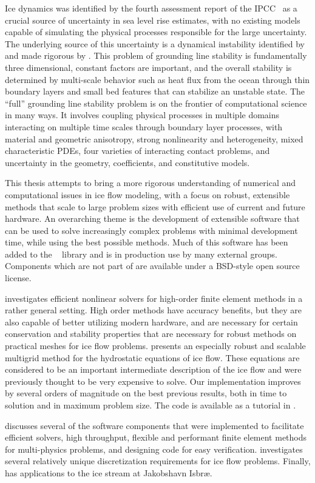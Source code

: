 Ice dynamics was identified by the fourth assessment report of the IPCC~\cite{lemk2007ar4wg1} as a crucial source of uncertainty in sea level rise estimates, with no existing models capable of simulating the physical processes responsible for the large uncertainty.
The underlying source of this uncertainty is a dynamical instability identified by \cite{weertman1974sji} and made rigorous by \cite{schoof2007isg}.
This problem of grounding line stability is fundamentally three dimensional, constant factors are important, and the overall stability is determined by multi-scale behavior such as heat flux from the ocean through thin boundary layers and small bed features that can stabilize an unstable state.
The ``full'' grounding line stability problem is on the frontier of computational science in many ways.
It involves coupling physical processes in multiple domains interacting on multiple time scales through boundary layer processes, with material and geometric anisotropy, strong nonlinearity and heterogeneity, mixed characteristic PDEs, four varieties of interacting contact problems, and uncertainty in the geometry, coefficients, and constitutive models.

This thesis attempts to bring a more rigorous understanding of numerical and computational issues in ice flow modeling, with a focus on robust, extensible methods that scale to large problem sizes with efficient use of current and future hardware.
An overarching theme is the development of extensible software that can be used to solve increasingly complex problems with minimal development time, while using the best possible methods.
Much of this software has been added to the {\PETSc}~\cite{petsc-user-ref} library and is in production use by many external groups.
Components which are not part of {\PETSc} are available under a BSD-style open source license.

 investigates efficient nonlinear solvers for high-order finite element methods in a rather general setting.
High order methods have accuracy benefits, but they are also capable of better utilizing modern hardware, and are necessary for certain conservation and stability properties that are necessary for robust methods on practical meshes for ice flow problems.
 presents an especially robust and scalable multigrid method for the hydrostatic equations of ice flow.
These equations are considered to be an important intermediate description of the ice flow and were previously thought to be very expensive to solve.
Our implementation improves by several orders of magnitude on the best previous results, both in time to solution and in maximum problem size.
The code is available as a tutorial in {\PETSc}.

 discusses several of the software components that were implemented to facilitate efficient solvers, high throughput, flexible and performant finite element methods for multi-physics problems, and designing code for easy verification.
 investigates several relatively unique discretization requirements for ice flow problems.
Finally,  has applications to the ice stream at Jakobshavn Isbr{\ae}.
